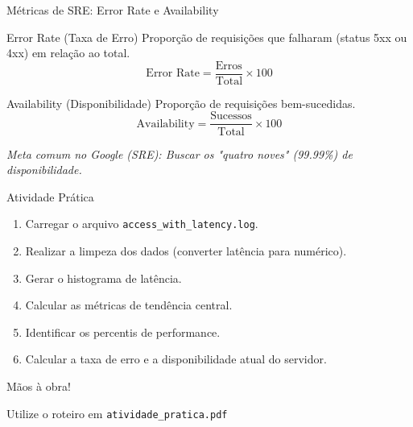 \documentclass[9pt]{beamer}
\begin{document}
\begin{frame}{Métricas de SRE: Error Rate e Availability}
    \begin{block}{Error Rate (Taxa de Erro)}
        Proporção de requisições que falharam (status 5xx ou 4xx) em relação ao total.
        \[ \text{Error Rate} = \frac{\text{Erros}}{\text{Total}} \times 100 \]
    \end{block}
    \begin{block}{Availability (Disponibilidade)}
        Proporção de requisições bem-sucedidas.
        \[ \text{Availability} = \frac{\text{Sucessos}}{\text{Total}} \times 100 \]
    \end{block}
    \textit{Meta comum no Google (SRE): Buscar os "quatro noves" (99.99\%) de disponibilidade.}
\end{frame}

\begin{frame}{Atividade Prática}
    \begin{enumerate}
        \item Carregar o arquivo \texttt{access\_with\_latency.log}.
        \item Realizar a limpeza dos dados (converter latência para numérico).
        \item Gerar o histograma de latência.
        \item Calcular as métricas de tendência central.
        \item Identificar os percentis de performance.
        \item Calcular a taxa de erro e a disponibilidade atual do servidor.
    \end{enumerate}
\end{frame}

\begin{frame}[plain, c]
    \begin{center}
        \Huge Mãos à obra!
        
        \vspace{1cm}
        \large Utilize o roteiro em \texttt{atividade\_pratica.pdf}
    \end{center}
\end{frame}
\end{document}
